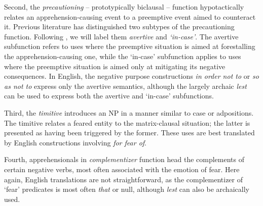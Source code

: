 \documentclass[output=paper,colorlinks,citecolor=brown]{langscibook}
\begin{document}
{Second, the \emph{precautioning} -- prototypically biclausal -- function hypotactically relates an apprehension-causing event to a preemptive event aimed to counteract it. Previous literature has distinguished two subtypes of the precautioning function. Following \citet{lichtenberk1995apprehensional}, we will label them \textit{avertive} and \textit{`in-case'}. The avertive subfunction refers to uses where the preemptive situation is aimed at forestalling the apprehension-causing one, while the `in-case' subfunction applies to uses where the preemptive situation is aimed only at mitigating its negative consequences. In English, the negative purpose constructions \textit{in order not to} or \textit{so as not to} express only the avertive semantics, although the largely archaic \textit{lest} can be used to express both the avertive and `in-case' subfunctions.}

Third, the \emph{timitive} introduces an NP in a manner similar to case or adpositions. The timitive relates a feared entity to the matrix-clausal situation; the latter is presented as having been triggered by the former. These uses are best translated by English constructions involving \textit{for fear of}.

Fourth, apprehensionals in \textit{complementizer} function head the complements of certain negative verbs, most often associated with the emotion of fear. Here again, English translations are not straightforward, as the complementizer of `fear' predicates is most often \textit{that} or null, although \textit{lest} can also be archaically used. 
\end{document}
